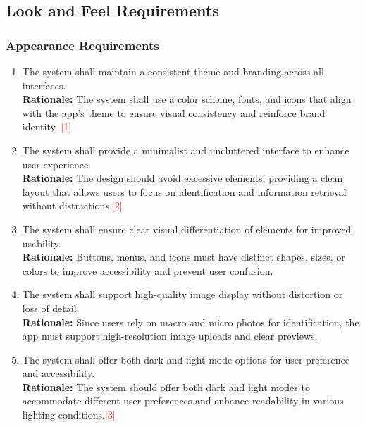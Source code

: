 \documentclass{article}
\begin{document}
\subsection{Look and Feel Requirements}
\label{sub:look_and_feel_requirements}

\subsubsection{Appearance Requirements}
\label{ssub:appearance_requirements}
\begin{enumerate}[{LF-A}1. ]
	\item The system shall maintain a consistent theme and branding across all interfaces.\\
	\textbf{Rationale:} The system shall use a color scheme, fonts, and icons that align with the app’s theme to ensure visual consistency and reinforce brand identity. \textcolor{red}{[1]}
	\item The system shall provide a minimalist and uncluttered interface to enhance user experience.\\
	\textbf{Rationale:} The design should avoid excessive elements, providing a clean layout that allows users to focus on identification and information retrieval without distractions.\textcolor{red}{[2]}
	\item The system shall ensure clear visual differentiation of elements for improved usability.\\
	\textbf{Rationale:} Buttons, menus, and icons must have distinct shapes, sizes, or colors to improve accessibility and prevent user confusion.
	\item The system shall support high-quality image display without distortion or loss of detail.\\
	\textbf{Rationale:} Since users rely on macro and micro photos for identification, the app must support high-resolution image uploads and clear previews.
	\item The system shall offer both dark and light mode options for user preference and accessibility.\\
	\textbf{Rationale:} The system should offer both dark and light modes to accommodate different user preferences and enhance readability in various lighting conditions.\textcolor{red}{[3]}
\end{enumerate}
\end{document}
